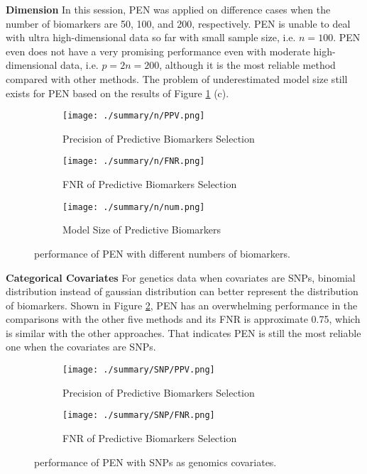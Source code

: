\documentclass[12pt]{article}
\begin{document}
\textbf{Dimension} In this session, PEN was applied on difference cases
when the number of biomarkers are 50, 100, and 200, respectively. PEN is
unable to deal with ultra high-dimensional data so far with small sample size,
i.e. $n=100$. PEN even does not have a very promising performance even with
moderate high-dimensional data, i.e. $p=2n=200$, although it is the most reliable method
compared with other methods. The problem of underestimated model size still exists for
PEN based on the results of Figure \ref{dim_fig} (c).

\begin{figure}[t]
  \begin{subfigure}{0.75\textwidth}
    \texttt{[image: ./summary/n/PPV.png]}
  \caption{Precision of Predictive Biomarkers Selection}
\end{subfigure}
\begin{subfigure}{0.75\textwidth}
  \texttt{[image: ./summary/n/FNR.png]}
  \caption{FNR of Predictive Biomarkers Selection}
\end{subfigure}
\begin{subfigure}{0.75\textwidth}
  \texttt{[image: ./summary/n/num.png]}
  \caption{Model Size of Predictive Biomarkers}
\end{subfigure}
  \centering
  \caption{performance of PEN with different numbers of biomarkers.
  }
  \label{dim_fig}
\end{figure}

\textbf{Categorical Covariates} For genetics data when covariates are SNPs,
binomial distribution instead of gaussian distribution can better represent the distribution of biomarkers.
Shown in Figure \ref{SNP}, PEN has an overwhelming performance in the comparisons with
the other five methods and its FNR is approximate 0.75, which is similar with the other approaches. That
indicates PEN is still the most reliable one when the covariates are SNPs.

\begin{figure}[t]
  \begin{subfigure}{0.75\textwidth}
    \texttt{[image: ./summary/SNP/PPV.png]}
  \caption{Precision of Predictive Biomarkers Selection}
\end{subfigure}
\begin{subfigure}{0.75\textwidth}
  \texttt{[image: ./summary/SNP/FNR.png]}
  \caption{FNR of Predictive Biomarkers Selection}
\end{subfigure}
  \centering
  \caption{performance of PEN with SNPs as genomics covariates.
  }
  \label{SNP}
\end{figure}
\end{document}
